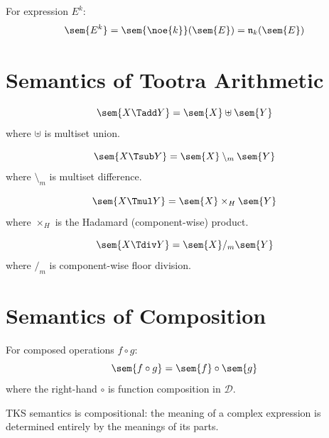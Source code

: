 \begin{definition}
\label{def:noetic-app-sem}
For expression $E^k$:
\[
\sem{E^k} = \sem{\noe{k}}(\sem{E}) = \mathfrak{n}_k(\sem{E})
\]
\end{definition}

\section{Semantics of Tootra Arithmetic}

\begin{definition}
\label{def:tadd-sem}
\[
\sem{X \Tadd Y} = \sem{X} \uplus \sem{Y}
\]
where $\uplus$ is multiset union.
\end{definition}

\begin{definition}
\label{def:tsub-sem}
\[
\sem{X \Tsub Y} = \sem{X} \setminus_m \sem{Y}
\]
where $\setminus_m$ is multiset difference.
\end{definition}

\begin{definition}
\label{def:tmul-sem}
\[
\sem{X \Tmul Y} = \sem{X} \times_H \sem{Y}
\]
where $\times_H$ is the Hadamard (component-wise) product.
\end{definition}

\begin{definition}
\label{def:tdiv-sem}
\[
\sem{X \Tdiv Y} = \sem{X} /_m \sem{Y}
\]
where $/_m$ is component-wise floor division.
\end{definition}

\section{Semantics of Composition}

\begin{definition}
\label{def:comp-sem}
For composed operations $f \circ g$:
\[
\sem{f \circ g} = \sem{f} \circ \sem{g}
\]
where the right-hand $\circ$ is function composition in $\mathcal{D}$.
\end{definition}

\begin{theorem}
\label{thm:compositional}
TKS semantics is compositional: the meaning of a complex expression is determined entirely by the meanings of its parts.
\end{theorem}

